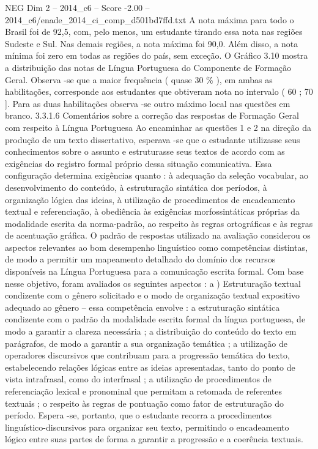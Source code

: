 \begin{textsample}{NEG Dim 2 – 2014\_c6 – Score -2.00 – 2014\_c6/enade\_2014\_ci\_comp\_d501bd7ffd.txt}
A nota máxima para todo o Brasil foi de 92,5, com, pelo menos, um estudante tirando essa nota nas regiões Sudeste e Sul.
Nas demais regiões, a nota máxima foi 90,0.
Além disso, a nota mínima foi zero em todas as regiões do país, sem exceção.
O Gráfico 3.10 mostra a distribuição das notas de Língua Portuguesa do Componente de Formação Geral.
Observa -se que a maior frequência ( quase 30 \% ), em ambas as habilitações, corresponde aos estudantes que obtiveram nota no intervalo ( 60 ; 70 ].
Para as duas habilitações observa -se outro máximo local nas questões em branco. 3.3.1.6 Comentários sobre a correção das respostas de Formação Geral com respeito à Língua Portuguesa Ao encaminhar as questões 1 e 2 na direção da produção de um texto dissertativo, esperava -se que o estudante utilizasse seus conhecimentos sobre o assunto e estruturasse seus textos de acordo com as exigências do registro formal próprio dessa situação comunicativa.
Essa configuração determina exigências quanto : à adequação da seleção vocabular, ao desenvolvimento do conteúdo, à estruturação sintática dos períodos, à organização lógica das ideias, à utilização de procedimentos de encadeamento textual e referenciação, à obediência às exigências morfossintáticas próprias da modalidade escrita da norma-padrão, ao respeito às regras ortográficas e às regras de acentuação gráfica.
O padrão de respostas utilizado na avaliação considerou os aspectos relevantes ao bom desempenho linguístico como competências distintas, de modo a permitir um mapeamento detalhado do domínio dos recursos disponíveis na Língua Portuguesa para a comunicação escrita formal.
Com base nesse objetivo, foram avaliados os seguintes aspectos : a ) Estruturação textual condizente com o gênero solicitado e o modo de organização textual expositivo adequado ao gênero – essa competência envolve : a estruturação sintática condizente com o padrão da modalidade escrita formal da língua portuguesa, de modo a garantir a clareza necessária ; a distribuição do conteúdo do texto em parágrafos, de modo a garantir a sua organização temática ; a utilização de operadores discursivos que contribuam para a progressão temática do texto, estabelecendo relações lógicas entre as ideias apresentadas, tanto do ponto de vista intrafrasal, como do interfrasal ; a utilização de procedimentos de referenciação lexical e pronominal que permitam a retomada de referentes textuais ; o respeito às regras de pontuação como fator de estruturação do período.
Espera -se, portanto, que o estudante recorra a procedimentos linguístico-discursivos para organizar seu texto, permitindo o encadeamento lógico entre suas partes de forma a garantir a progressão e a coerência textuais.

\end{textsample}
